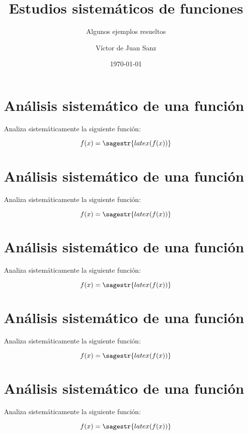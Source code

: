 \documentclass[nochap,palatino,nobuilddate]{estudioFuncion}
\title{Estudios sistemáticos de funciones}
\author{Víctor de Juan Sanz}
\date{\today}
\subtitle{Algunos ejemplos resueltos}
\newcommand{\newexample}[1]{
	\section{Análisis sistemático de una función}
	Analiza sistemáticamente la siguiente función:
	
	\begin{mdframed}
	\[f(x) = \sagestr{latex(f(x))}\]
	\end{mdframed}
	
	\newpage
}
\begin{document}
\maketitle


\newexample{tex/function}
\newexample{tex/function2}
\newexample{tex/function3}
\newexample{tex/function4}
\newexample{tex/function5}
\end{document}
